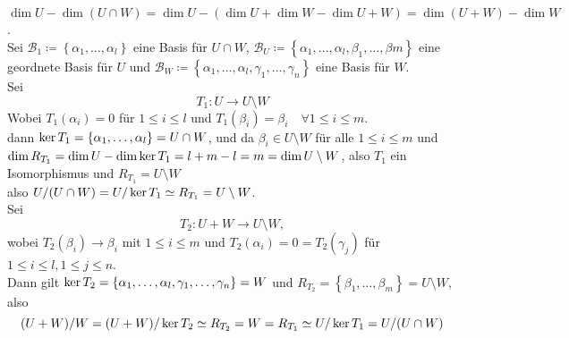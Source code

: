\documentclass[sectionformat = aufgabe]{gadsescript}
\begin{document}
\subsection{}
$ \dim U - \dim ( U \cap W ) = \dim U - ( \dim U + \dim W - \dim U + W ) = \dim ( U + W ) - \dim W $.\\
Sei $ \mathcal{B} _1 \coloneqq  \left\{ \alpha_1, \dotsc, \alpha_l \right\}  $ eine Basis für $ U \cap W $,
$ \mathcal{B} _U \coloneqq \left\{ \alpha_1, \dotsc, \alpha_l, \beta_1, \dotsc, \beta m \right\}  $ eine geordnete Basis für $ U $ und
$ \mathcal{B} _W \coloneqq \left\{ \alpha_1, \dotsc, \alpha_l, \gamma_1, \dotsc, \gamma_n \right\} $ eine Basis für $ W $.\\
Sei
\[ 
	T_1: U \to U \setminus W
\]
Wobei $ T_1(\alpha_i) = 0 $ für $ 1 \leq i \leq l $ und $ T_1(\beta_i) = \beta_i \quad \forall 1 \leq i \leq m $.\\
dann $ \operatorname{ker} T_1 = \left\{ \alpha_1, \dotsc, \alpha_l \right\} = U \cap W $, und da $ \beta_i \in U \setminus W $ für alle $ 1 \leq i \leq m $ und $ \dim R_{T_1}  = \dim U - \dim \operatorname{ker} T_1 = l + m - l = m = \dim U \setminus W $, also $ T_1 $ ein Isomorphismus und $ R_{T_1}  = U \setminus W $\\
also $ U / (U \cap W) = U / \operatorname{ker} T_1 \simeq R_{T_1}  = U \setminus W $.\\
Sei
\[
	T_2 : U + W \to U \setminus  W,
\]
wobei $ T_2(\beta_i) \to \beta_i $ mit $ 1 \leq i \leq m $ und $ T_2(\alpha_i) = 0 = T_2(\gamma_j) $ für $ 1 \leq i \leq l, 1 \leq j \leq n $.\\
Dann gilt $ \operatorname{ker} T_2 = \left\{ \alpha_1, \dotsc, \alpha_l, \gamma_1, \dotsc, \gamma_n \right\} = W $ und 
$ R_{T_2} = \left\{ \beta_1, \dotsc, \beta_m \right\} = U \setminus W $, also
\[
	(U + W) / W = ( U + W ) / \operatorname{ker} T_2 \simeq R_{T_2} = W = R_{T_1} \simeq U / \operatorname{ker} T_1 = U / (U \cap W)
\]
\end{document}
